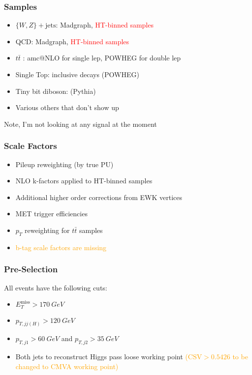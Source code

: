 \documentclass{beamer}
\newcommand{\ttbar}{\ensuremath{t\bar{t}} \hspace{2pt}}
\newcommand{\MET}{\ensuremath{E_{T}^{\mathrm{miss}}}}
\begin{document}

\begin{frame}
  \frametitle{Samples}
  \begin{itemize}
  \item $\{W,Z\} + \mathrm{jets}$: Madgraph, \textcolor{red}{HT-binned samples}
  \item QCD: Madgraph, \textcolor{red}{HT-binned samples}
  \item \ttbar: amc@NLO for single lep, POWHEG for double lep
  \item Single Top: inclusive decays (POWHEG)
  \item Tiny bit diboson: (Pythia)
  \item Various others that don't show up
  \end{itemize}

  Note, I'm not looking at any signal at the moment
\end{frame}

\begin{frame}
  \frametitle{Scale Factors}

  \begin{itemize}
  \item Pileup reweighting (by true PU)
  \item NLO k-factors applied to HT-binned samples
  \item Additional higher order corrections from EWK vertices
  \item MET trigger efficiencies
  \item $p_T$ reweighting for \ttbar samples
  \item \textcolor{orange}{b-tag scale factors are missing}
  \end{itemize}

\end{frame}

\begin{frame}
  \frametitle{Pre-Selection}
  All events have the following cuts:

  \begin{itemize}
  \item $\MET > \SI{170}{GeV}$
  \item $p_{T, jj(H)} > \SI{120}{GeV}$
  \item $p_{T, j1} > \SI{60}{GeV}$ and $p_{T, j2} > \SI{35}{GeV}$
  \item Both jets to reconstruct Higgs pass loose working point
    \textcolor{orange}{($\mathrm{CSV} > 0.5426$ to be changed to CMVA working point)}
  \end{itemize}
\end{frame}
\end{document}
